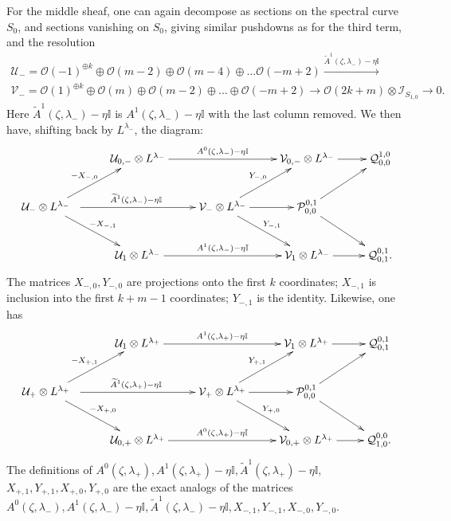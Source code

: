 \documentclass[12pt]{article}
\theoremstyle{definition}
\theoremstyle{remark}
\numberwithin{theorem}{section}
\def\bI{{\mathbb {I}}}
\def\pI{{\mathcal I}}
\def\pO{{\mathcal O}}
\def\pP{{\mathcal P}}
\def\pQ{{\mathcal Q}}
\def\pU{{\mathcal U}}
\def\pV{{\mathcal V}}
\begin{document}
 For the middle sheaf, one can again decompose as sections on the spectral curve $S_0$, and sections vanishing on $S_0$, giving   similar pushdowns as for the third term, and the resolution
\begin{multline*}
\pU_-=\pO(-1 )^{\oplus k}   \oplus \pO(m-2 ) \oplus  
 \pO(m-4  )\oplus... \pO(-m+2  ){\xrightarrow{ \widetilde A^1(\zeta,\lambda_-)-\eta\bI}}\\
\pV_- =\pO(1)^{\oplus k} \oplus \pO(m) \oplus 
 \pO(m-2)\oplus...\oplus \pO(-m+2) \rightarrow    \pO(2k+m)\otimes \pI_{S_{1,0}} \rightarrow 0. 
 \end{multline*}
Here $\widetilde A^1(\zeta,\lambda_-)-\eta\bI$ is $  A^1(\zeta,\lambda_-)-\eta\bI $ with the last column removed.
We then have, shifting back by $L^{\lambda_-}$, the diagram:
%
\begin{equation} \label{resolution-twistor-PQ-TN-1}
 \xymatrix{    
 & \pU_{0,-}\otimes L^{\lambda_-}\ar[rr]^{ A^0(\zeta,\lambda_-)-\eta\bI} &&\pV_{0,-}\otimes L^{\lambda_-} \ar[r]  &\pQ_{0 ,0}^{ 1,0} \\
\pU_{-}\otimes L^{\lambda_-}\ \ \ar[dr]^{-X_{ -,1}  } \ar[rr]^{\widetilde A^1(\zeta,\lambda_-)-\eta\bI}\ar[ur]^{-X_{-,0} }&&  \pV_{-}\otimes L^{\lambda_-}\ar[dr]^{Y_{-,1}}\ar[ur]^{Y_{-,0}}\ar[r]  &\pP_{0,0}^{0,1}\ar[dr] \ar[ur]\\
 & \pU_{1}\otimes L^{\lambda_-} \ar[rr]^{A^1(\zeta,\lambda_-)-\eta\bI} &&\pV_{1}\otimes L^{\lambda_-}\ar[r]  &\pQ_{0,1}^{0,1}. 
 }
\end{equation}
The matrices $X_{-,0}, Y_{-,0}$ are projections onto the first $k$ coordinates;   $X_{-,1}$ is inclusion into the first $k+m-1$ coordinates;  $Y_{-,1}$ is the identity.
Likewise, one has 
     \begin{equation} \label{resolution-twistor-PQ-TN-2}\xymatrix{    
      & \pU_{1}\otimes L^{\lambda_+} \ar[rr]^{A^1(\zeta,\lambda_+)-\eta\bI} &&\pV_{1}\otimes L^{\lambda_+}\ar[r]  &\pQ_{0,1}^{0,1} \\
\pU_{+}\otimes L^{\lambda_+}\ \ \ar[ur]^{-X_{ +,1}  } \ar[rr]^{\widetilde A^1(\zeta,\lambda_+)-\eta\bI}\ar[dr]^{-X_{+,0} }&&  \pV_{+}\otimes L^{\lambda_+}\ar[ur]^{Y_{+,1}}\ar[dr]^{Y_{+,0}}\ar[r]  &\pP_{0,0}^{0,1}\ar[dr] \ar[ur]\\
 & \pU_{0,+}\otimes L^{\lambda_+}\ar[rr]^{ A^0(\zeta,\lambda_+)-\eta\bI} &&\pV_{0,+}\otimes L^{\lambda_+} \ar[r]  &\pQ^{0 ,0}_{ 1,0}. \\
 }
\end{equation}
The definitions of $A^0(\zeta,\lambda_+), A^1(\zeta,\lambda_+)-\eta\bI, \widetilde A^1(\zeta,\lambda_+)-\eta\bI,$ $ X_{ +,1}, Y_{ +,1}, X_{ +,0}, Y_{+,0}$ are the exact analogs of the matrices  $A^0(\zeta,\lambda_-),  A^1(\zeta,\lambda_-)-\eta\bI, \widetilde A^1(\zeta,\lambda_-)-\eta\bI, X_{ -,1}, Y_{ -,1}, X_{ -,0}, Y_{-,0}$. 
\end{document}
